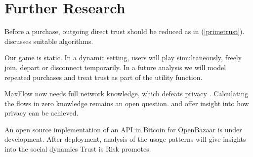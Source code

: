 \section{Further Research}
  Before a purchase, outgoing direct trust should be reduced as in (\ref{primetrust}). \cite{trustisriskmaster} discusses
  suitable algorithms.

  Our game is static. In a dynamic setting, users will play simultaneously, freely join, depart or disconnect temporarily. In
  a future analysis we will model repeated purchases and treat trust as part of the utility function. 

  MaxFlow now needs full network knowledge, which defeats privacy \cite{deanonymisation}. Calculating the flows in zero
  knowledge remains an open question. \cite{silentwhispers} and \cite{privpay} offer insight into how privacy can be achieved.

  An open source implementation of an API in Bitcoin for OpenBazaar is under development. After deployment, analysis of the
  usage patterns will give insights into the social dynamics Trust is Risk promotes.
